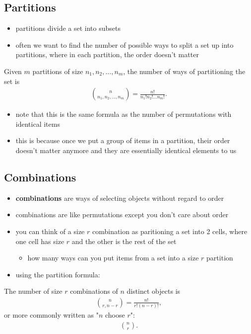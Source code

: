 \documentclass[10pt]{article}
\begin{document}
\subsection{Partitions}
\begin{itemize}
    \item partitions divide a set into subsets
    \item often we want to find the number of possible ways to split a set up into partitions, where in each partition, the order doesn't matter
\end{itemize}
\begin{theorem}
    Given $m$ partitions of size $n_1, n_2, \ldots, n_m$, the number of ways of partitioning the set is 
    \begin{align*}
        {n \choose n_1, n_2, \ldots, n_m} = \frac{n!}{n_1! n_2! \ldots n_m!}
    .\end{align*}
\end{theorem}
\begin{itemize}
    \item note that this is the same formula as the number of permutations with identical items
    \item this is because once we put a group of items in a partition, their order doesn't matter anymore and they are essentially identical elements to us
\end{itemize}


\subsection{Combinations}
\begin{itemize}
    \item \textbf{combinations} are ways of selecting objects without regard to order
    \item combinations are like permutations except you don't care about order
    \item you can think of a size $r$ combination as paritioning a set into 2 cells, where one cell has size $r$ and the other is the rest of the set
        \begin{itemize}
            \item how many ways can you put items from a set into a size $r$ partition
        \end{itemize}
    \item using the partition formula:
\end{itemize}
\begin{theorem}
    The number of size $r$ combinations of $n$ distinct objects is
    \begin{align*}
        {n \choose r, n-r} = \frac{n!}{r!(n-r)!}
    ,\end{align*}
    or more commonly written as "$n$ choose $r$":
    \begin{align*}
        {n \choose r}
    .\end{align*}
\end{theorem}
\end{document}
